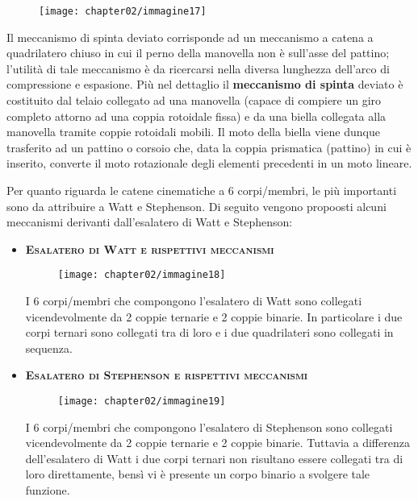 \begin{figure}[h]
\centering
\texttt{[image: chapter02/immagine17]}
\end{figure}

Il meccanismo di spinta deviato corrisponde ad un meccanismo a catena a quadrilatero chiuso in cui il perno della manovella non è sull'asse del pattino; l'utilità di tale meccanismo è da ricercarsi nella diversa lunghezza dell'arco di compressione e espasione.\newline
Più nel dettaglio il \textbf{meccanismo di spinta} deviato è costituito dal telaio collegato ad una manovella (capace di compiere un giro completo attorno ad una coppia rotoidale fissa) e da una biella collegata alla manovella tramite coppie rotoidali mobili. 
Il moto della  biella viene dunque trasferito ad un pattino o corsoio che, data la coppia prismatica (pattino) in cui è inserito, converte il moto rotazionale degli elementi precedenti in un moto lineare.


Per quanto riguarda le catene cinematiche a 6 corpi/membri, le più importanti sono da attribuire a Watt e Stephenson.
Di seguito vengono propoosti alcuni meccanismi derivanti dall'esalatero di Watt e Stephenson:

\begin{itemize}
\item {\scshape{\bfseries Esalatero di Watt e rispettivi meccanismi}}
\begin{figure}[h]
\centering
\texttt{[image: chapter02/immagine18]}
\end{figure}\newline
I 6 corpi/membri che compongono l'esalatero di Watt sono collegati vicendevolmente da 2 coppie ternarie e 2 coppie binarie.\newline
In particolare i due corpi ternari sono collegati tra di loro e i due quadrilateri sono collegati in sequenza.
 
\item {\scshape{\bfseries Esalatero di Stephenson e rispettivi meccanismi}}

\begin{figure}[!h]
\centering
\texttt{[image: chapter02/immagine19]}
\end{figure}

I 6 corpi/membri che compongono l'esalatero di Stephenson sono collegati vicendevolmente da 2 coppie ternarie e 2 coppie binarie. \newline
Tuttavia a differenza dell'esalatero di Watt i due corpi ternari non risultano essere collegati tra di loro direttamente, bensì vi è presente un corpo binario a svolgere tale funzione.
\end{itemize}

